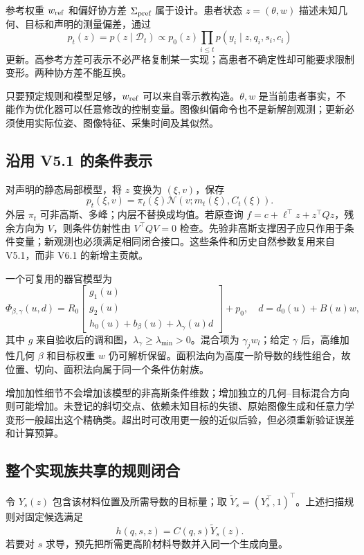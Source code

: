 \documentclass[UTF8,11pt,a4paper,fontset=fandol]{ctexart}
\numberwithin{equation}{section}
\theoremstyle{definition}
\newcommand{\D}{\mathcal D}
\newcommand{\N}{\mathcal N}
\begin{document}
参考权重 $w_{\rm ref}$ 和偏好协方差 $\Sigma_{\rm pref}$ 属于设计。患者状态 $z=(\theta,w)$ 描述未知几何、目标和声明的测量偏差，通过
\begin{equation}
 p_t(z)=p(z\mid\D_t)\propto p_0(z)\prod_{i\le t}p(y_i\mid z,q_i,s_i,c_i)
 \label{eq:bayes}
\end{equation}
更新。高参考方差可表示不必严格复制某一实现；高患者不确定性却可能要求限制变形。两种协方差不能互换。

只要预定规则和模型足够，$w_{\rm ref}$ 可以来自零示教构造。$\theta,w$ 是当前患者事实，不能作为优化器可以任意修改的控制变量。图像纠偏命令也不是新解剖观测；更新必须使用实际位姿、图像特征、采集时间及其似然。

\subsection{沿用 V5.1 的条件表示}
对声明的静态局部模型，将 $z$ 变换为 $(\xi,v)$，保存
\begin{equation}
 p_t(\xi,v)=\pi_t(\xi)\N(v;m_t(\xi),C_t(\xi)).
 \label{eq:rb}
\end{equation}
外层 $\pi_t$ 可非高斯、多峰；内层不替换成均值。若原查询 $f=c+\ell^\top z+z^\top Qz$，残余方向为 $V$，则条件仿射性由 $V^\top QV=0$ 检查。先验非高斯支撑因子应只作用于条件变量；新观测也必须满足相同闭合接口。这些条件和历史自然参数复用来自 V5.1，而非 V6.1 的新增主贡献\cite{v51,murray}。

一个可复用的器官模型为
\begin{equation}
 \Phi_{\beta,\gamma}(u,d)=R_0
 \begin{bmatrix}g_1(u)\\g_2(u)\\h_0(u)+b_\beta(u)+\lambda_\gamma(u)d\end{bmatrix}+p_0,
 \quad d=d_0(u)+B(u)w,
 \label{eq:height}
\end{equation}
其中 $g$ 来自验收后的调和图，$\lambda_\gamma\ge\lambda_{\min}>0$。混合项为 $\gamma_jw_l$；给定 $\gamma$ 后，高维加性几何 $\beta$ 和目标权重 $w$ 仍可解析保留。面积法向为高度一阶导数的线性组合，故位置、切向、面积法向属于同一个条件仿射族。

增加加性细节不会增加该模型的非高斯条件维数；增加独立的几何--目标混合方向则可能增加。未登记的斜切交点、依赖未知目标的失锁、原始图像生成和任意力学变形一般超出这个精确类。超出时可改用更一般的近似后验，但必须重新验证误差和计算预算。

\subsection{整个实现族共享的规则闭合}
令 $Y_s(z)$ 包含该材料位置及所需导数的目标量；取 $\widetilde Y_s=(Y_s^\top,1)^\top$。上述扫描规则对固定候选满足
\begin{equation}
 h(q,s,z)=C(q,s)\widetilde Y_s(z).
 \label{eq:module}
\end{equation}
若要对 $s$ 求导，预先把所需更高阶材料导数并入同一个生成向量。
\end{document}
